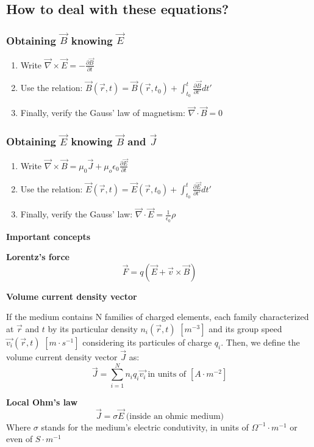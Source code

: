 \documentclass[11pt]{article}
\theoremstyle{definition}
\begin{document}
\subsection{How to deal with these equations?}
\subsubsection{Obtaining $\vec{B}$ knowing $\vec{E}$}
\begin{enumerate}[label=(\roman*)]
    \item Write $\vec{\nabla} \times \vec{E} = -\frac{\partial \vec{B}}{\partial t}$
    \item Use the relation: $\vec{B}(\vec{r},t) = \vec{B}(\vec{r},t_0) + \int_{t_0}^{t} \frac{\partial \vec{B}}{\partial t'}dt'$
    \item Finally, verify the Gauss' law of magnetism: $\vec{\nabla} \cdot \vec{B} = 0$
\end{enumerate}

\subsubsection{Obtaining $\vec{E}$ knowing $\vec{B}$ and $\vec{J}$}
\begin{enumerate}[label=(\roman*)]
    \item Write $\vec{\nabla} \times \vec{B} = \mu_0 \vec{J} + \mu_o \epsilon_0 \frac{\partial \vec{E}}{\partial t}$
    \item Use the relation: $\vec{E}(\vec{r},t) = \vec{E}(\vec{r},t_0) + \int_{t_0}^{t} \frac{\partial \vec{E}}{\partial t'}dt'$
    \item Finally, verify the Gauss' law: $\vec{\nabla} \cdot \vec{E} = \frac{1}{\epsilon_{0}}\rho$
\end{enumerate}

\begin{shaded}
\textbf{Important concepts}

    \textbf{Lorentz's force}
    \begin{equation}
        \vec{F} = q\left(\vec{E}+\vec{v} \times \vec{B}\right)
    \end{equation}

    \textbf{Volume current density vector}
    
    If the medium contains N families of charged elements, each family characterized at $\vec{r}$ and $t$ by its particular
    density $n_{i}\left(\vec{r},t\right)$ $[m^{-3}]$ and its group speed $\vec{v_{i}}(\vec{r},t)$ $[m\cdot s^{-1}]$ considering its particules of charge $q_{i}$.
    Then, we define the volume current density vector $\vec{J}$ as:
    \begin{equation}
        \vec{J} = \sum_{i=1}^{N} n_{i}q_{i}\vec{v_{i}}\ \text{in units of $[A\cdot m^{-2}]$}
    \end{equation}

    \textbf{Local Ohm's law}
    \begin{equation}
        \vec{J} = \sigma \vec{E}\ \text{(inside an ohmic medium)}
    \end{equation}
    Where $\sigma$ stands for the medium's electric condutivity, in units of $\Omega^{-1} \cdot m^{-1}$ or even of $S \cdot m^{-1}$
\end{shaded}
\end{document}
